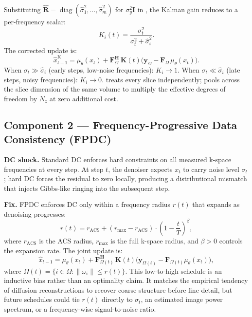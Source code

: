 \documentclass[10pt,twocolumn,letterpaper]{article}
\newcommand{\hatR}{\hat{\mathbf{R}}}
\newcommand{\hatsig}{\hat{\sigma}}
\newcommand{\muth}{\mu_\theta}
\begin{document}
Substituting $\hatR=\operatorname{diag}(\hatsig_1^2,\ldots,\hatsig_m^2)$
for $\sigma_y^2\mathbf{I}$ in , the Kalman gain reduces to
a per-frequency scalar:
\begin{equation}
  K_i(t) = \frac{\sigma_t^2}{\sigma_t^2 + \hatsig_i^2}.
  \label{eq:gain}
\end{equation}
The corrected update is:
\begin{equation}
  \hat{x}_{t-1}^{\text{K}} = \muth(x_t)
  + \mathbf{F}_\Omega^\mathbf{H}\, \mathbf{K}(t)
  \bigl(\mathbf{y}_\Omega - \mathbf{F}_\Omega\,\muth(x_t)\bigr).
  \label{eq:kalman_update}
\end{equation}
When $\sigma_t \gg \hatsig_i$ (early steps, low-noise frequencies): $K_i
\rightarrow 1$. When $\sigma_t \ll \hatsig_i$ (late steps, noisy
frequencies): $K_i \rightarrow 0$.  treats every slice
independently;  pools across the slice dimension of the
same volume to multiply the effective degrees of freedom by $N_z$ at zero
additional cost.

\subsection{Component 2 — Frequency-Progressive Data Consistency (FPDC)}

\textbf{DC shock.} Standard DC enforces hard constraints on all measured
k-space frequencies at every step. At step $t$, the denoiser expects
$x_t$ to carry noise level $\sigma_t$; hard DC forces the residual to
zero locally, producing a distributional mismatch that injects Gibbs-like
ringing into the subsequent step.

\textbf{Fix.} FPDC enforces DC only within a frequency radius $r(t)$ that
expands as denoising progresses:
\begin{equation}
  r(t) = r_{\text{ACS}} + (r_{\max} - r_{\text{ACS}})
  \cdot \left(1 - \frac{t}{T}\right)^\beta,
  \label{eq:fpdc}
\end{equation}
where $r_{\text{ACS}}$ is the ACS radius, $r_{\max}$ is the full k-space
radius, and $\beta > 0$ controls the expansion rate. The joint update is:
\begin{equation}
  \hat{x}_{t-1} = \muth(x_t) + \mathbf{F}_{\Omega(t)}^\mathbf{H}\,
  \mathbf{K}(t)\bigl(\mathbf{y}_{\Omega(t)} -
  \mathbf{F}_{\Omega(t)}\muth(x_t)\bigr),
  \label{eq:combined}
\end{equation}
where $\Omega(t) = \{i \in \Omega : \|\omega_i\| \leq r(t)\}$.
This low-to-high schedule is an inductive bias rather than an optimality
claim. It matches the empirical tendency of diffusion reconstructions to
recover coarse structure before fine detail, but future schedules could tie
$r(t)$ directly to $\sigma_t$, an estimated image power spectrum, or a
frequency-wise signal-to-noise ratio.
\end{document}
